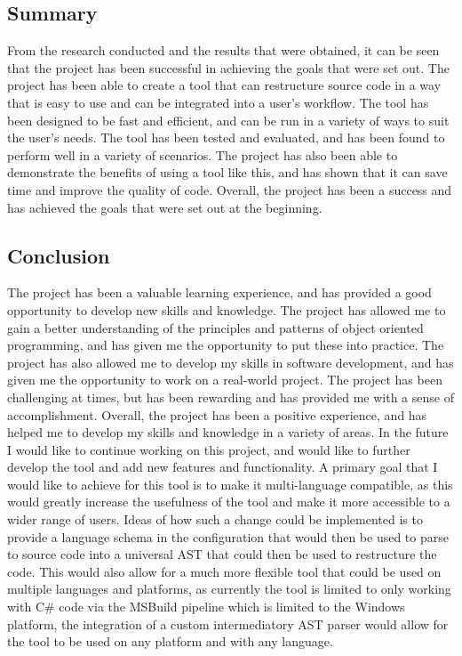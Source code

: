 \subsection{Summary}
From the research conducted and the results that were obtained, it can be seen that the project has been successful in achieving the goals that were set out. The project has been able to create a tool that can restructure source code in a way that is easy to use and can be integrated into a user's workflow. The tool has been designed to be fast and efficient, and can be run in a variety of ways to suit the user's needs. The tool has been tested and evaluated, and has been found to perform well in a variety of scenarios. The project has also been able to demonstrate the benefits of using a tool like this, and has shown that it can save time and improve the quality of code. Overall, the project has been a success and has achieved the goals that were set out at the beginning.

\subsection{Conclusion}
The project has been a valuable learning experience, and has provided a good opportunity to develop new skills and knowledge. The project has allowed me to gain a better understanding of the principles and patterns of object oriented programming, and has given me the opportunity to put these into practice. The project has also allowed me to develop my skills in software development, and has given me the opportunity to work on a real-world project. The project has been challenging at times, but has been rewarding and has provided me with a sense of accomplishment. Overall, the project has been a positive experience, and has helped me to develop my skills and knowledge in a variety of areas.
In the future I would like to continue working on this project, and would like to further develop the tool and add new features and functionality. A primary goal that I would like to achieve for this tool is to make it multi-language compatible, as this would greatly increase the usefulness of the tool and make it more accessible to a wider range of users. Ideas of how such a change could be implemented is to provide a language schema in the configuration that would then be used to parse to source code into a universal AST that could then be used to restructure the code. This would also allow for a much more flexible tool that could be used on multiple languages and platforms, as currently the tool is limited to only working with C\# code via the MSBuild pipeline which is limited to the Windows platform, the integration of a custom intermediatory AST parser would allow for the tool to be used on any platform and with any language.
